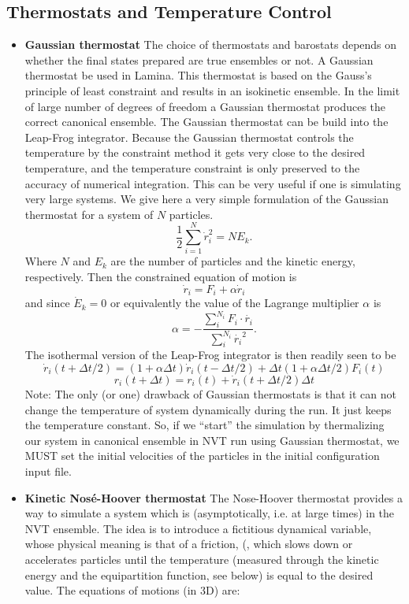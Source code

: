 \documentclass[a4paper,10pt]{article}
\begin{document}
\begin{itemize}
\subsection*{Thermostats and Temperature Control}
\begin{itemize}
\item \textbf{Gaussian thermostat}
The choice of thermostats and barostats depends on whether the final states prepared are true ensembles or not.
A Gaussian thermostat be used in Lamina. This thermostat is based on the Gauss's principle of least constraint 
and results in an isokinetic ensemble. In the limit of large number of degrees of freedom a Gaussian thermostat produces 
the correct canonical ensemble. The Gaussian thermostat can be build into the Leap-Frog integrator. Because the Gaussian 
thermostat controls the temperature by the constraint method it gets very close to the desired temperature, and the 
temperature constraint is only preserved to the accuracy of numerical integration. This can be very useful if one is 
simulating very large systems. We give here a very simple formulation of the Gaussian thermostat for a system of $N$ 
particles.
\begin{equation}
\frac{1}{2}\sum_{i=1}^{N} \dot{r}_i^2 = N E_k.
\end{equation}
Where $N$ and $E_k$ are the number of particles and the kinetic energy, respectively. Then the constrained equation of 
motion is
\begin{equation}
\dot{r}_i = F_i + \alpha \dot{r}_i
\end{equation}
and since $\dot{E}_k = 0$ or equivalently the value of the Lagrange multiplier $\alpha$ is
\begin{equation}
\alpha = -\frac{\sum_{i}^{N_i} F_i \cdot \dot{r_i}}{\sum_{i}^{N_i} \dot{r_i}^2}.
\end{equation}
The isothermal version of the Leap-Frog integrator is then readily seen to be
\begin{equation}
\dot{r}_i(t + \Delta t/2) = (1 + \alpha \Delta t) \dot{r}_i(t - \Delta t/2) + \Delta t (1 + \alpha \Delta t / 2) F_i(t)
\end{equation}
\begin{equation}
r_i(t + \Delta t) = r_i(t) + \dot{r}_i(t + \Delta t/2) \Delta t
\end{equation}
Note: The only (or one) drawback of Gaussian thermostats is that it can not change the temperature of system dynamically during 
the run. It just keeps the temperature constant. So, if we ``start'' the simulation by thermalizing our system in 
canonical ensemble in NVT run using Gaussian thermostat, we MUST set the initial velocities of the particles in the 
initial configuration input file.
\item \textbf{Kinetic Nos\'e-Hoover thermostat}
The Nose-Hoover thermostat provides a way to simulate a system which
is (asymptotically, i.e. at large times) in the NVT ensemble. 
The idea is
to introduce a fictitious dynamical variable, whose physical meaning is that
of a friction, (, which slows down or accelerates particles until the temperature
(measured through the kinetic energy and the equipartition function, see below)
is equal to the desired value. The equations of motions (in 3D) are:


\end{itemize}
\end{itemize}
\end{document}
